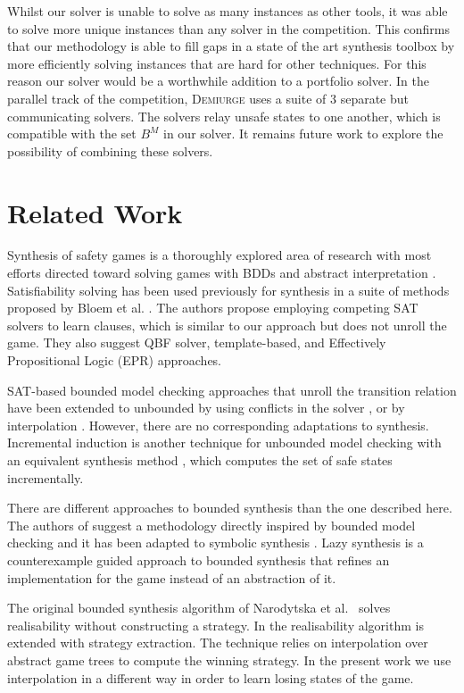 \documentclass{llncs}
\begin{document}
Whilst our solver is unable to solve as many instances as other tools, it was
able to solve more unique instances than any solver in the competition. This
confirms that our methodology is able to fill gaps in a state of the art
synthesis toolbox by more efficiently solving instances that are hard for other
techniques. For this reason our solver would be a worthwhile addition to a
portfolio solver. In the parallel track of the competition, \textsc{Demiurge}
uses a suite of 3 separate but communicating solvers. The solvers
relay unsafe states to one another, which is compatible with the set $B^M$ in
our solver. It remains future work to explore the possibility of combining
these solvers.

\section{Related Work}

Synthesis of safety games is a thoroughly explored area of research with most
efforts directed toward solving games with BDDs \cite{burch1990} and abstract
interpretation \cite{walker2014,brenguier2014}. Satisfiability solving has been used
previously for synthesis in a suite of methods proposed by Bloem et al.
\cite{bloem2014}. The authors propose employing competing SAT solvers
to learn clauses, which is similar to our approach but does not unroll the
game. They also suggest QBF solver, template-based, and Effectively
Propositional Logic (EPR) approaches.

SAT-based bounded model checking approaches that unroll the transition relation
have been extended to unbounded by using conflicts in the solver
\cite{mcmillan2002}, or by interpolation \cite{mcmillan2003}. However, there
are no corresponding adaptations to synthesis. Incremental induction
\cite{bradley2011} is another technique for unbounded model checking with an
equivalent synthesis method \cite{morgenstern2013}, which computes the set of
safe states incrementally.

There are different approaches to bounded synthesis than the one described
here. The authors of \cite{finkbeiner2013} suggest a methodology directly
inspired by bounded model checking and it has been adapted to symbolic
synthesis \cite{ehlers2010}. Lazy synthesis \cite{finkbeiner2012} is a
counterexample guided approach to bounded synthesis that refines an
implementation for the game instead of an abstraction of it.

The original bounded synthesis algorithm of Narodytska et
al.~\cite{narodytska2014} solves realisability without constructing a strategy.
In \cite{een2015} the realisability algorithm is extended with strategy
extraction. The technique relies on interpolation over abstract game trees to
compute the winning strategy.  In
the present work we use interpolation in a different way in order to learn
losing states of the game.
\end{document}
